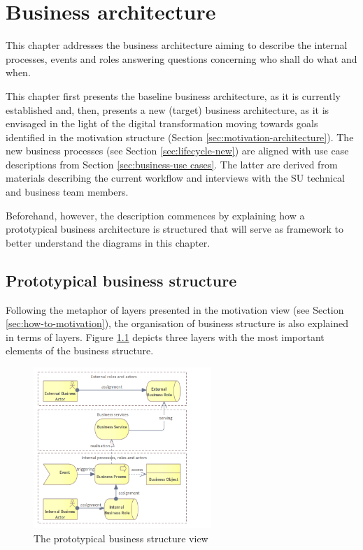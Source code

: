 
	
\chapter{Business architecture}
\label{sec:business-architecture}
	
	This chapter addresses the business architecture aiming to describe the internal processes, events and roles answering questions concerning who shall do what and when.
	
	This chapter first presents the baseline business architecture, as it is currently established and, then, presents a new (target) business architecture, as it is envisaged in the light of the digital transformation moving towards goals identified in the motivation structure (Section \ref{sec:motivation-architecture}). The new business processes (see Section \ref{sec:lifecycle-new}) are aligned with use case descriptions from Section \ref{sec:business-use cases}. The latter are derived from materials describing the current workflow and interviews with the SU technical and business team members.

	Beforehand, however, the description commences by explaining how a prototypical business architecture is structured that will serve as framework to better understand the diagrams in this chapter. 	
	
	\section{Prototypical business structure}
	
	Following the metaphor of layers presented in the motivation view (see Section \ref{sec:how-to-motivation}), the organisation of business structure is also explained in terms of layers. Figure \ref{fig:business-structure-protopypical} depicts three layers with the most important elements of the business structure. 
	
	\begin{figure}[h]
		\centering
		\includegraphics[width=0.6\textwidth]{images/views/Business view.png}
		\caption{The prototypical business structure view}
		\label{fig:business-structure-protopypical}
	\end{figure} 
	
